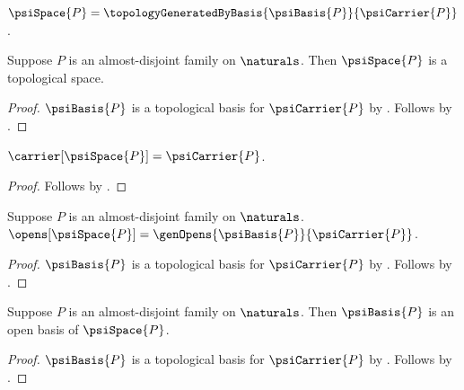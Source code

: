 \begin{definition}\label{psi_space}
    $\psiSpace{P}=\topologyGeneratedByBasis{\psiBasis{P}}{\psiCarrier{P}}$.
\end{definition}

\begin{classification}\label{psi_space_is_topological_space}
    Suppose $P$ is an almost-disjoint family on $\naturals$.
    Then $\psiSpace{P}$ is a topological space.
\end{classification}
\begin{proof}
    $\psiBasis{P}$ is a topological basis for $\psiCarrier{P}$
        by .
    Follows by
        .
\end{proof}

\begin{proposition}\label{psi_space_carrier}
    $\carrier[\psiSpace{P}]=\psiCarrier{P}$.
\end{proposition}
\begin{proof}
    Follows by
        .
\end{proof}

\begin{proposition}\label{psi_space_opens}
    Suppose $P$ is an almost-disjoint family on $\naturals$.
    $\opens[\psiSpace{P}]=\genOpens{\psiBasis{P}}{\psiCarrier{P}}$.
\end{proposition}
\begin{proof}
    $\psiBasis{P}$ is a topological basis for $\psiCarrier{P}$ by
        .
    Follows by
        .
\end{proof}

\begin{theorem}\label{psi_basis_is_open_basis}
    Suppose $P$ is an almost-disjoint family on $\naturals$.
    Then $\psiBasis{P}$ is an open basis of $\psiSpace{P}$.
\end{theorem}
\begin{proof}
    $\psiBasis{P}$ is a topological basis for $\psiCarrier{P}$
        by .
    Follows by
        .
\end{proof}

